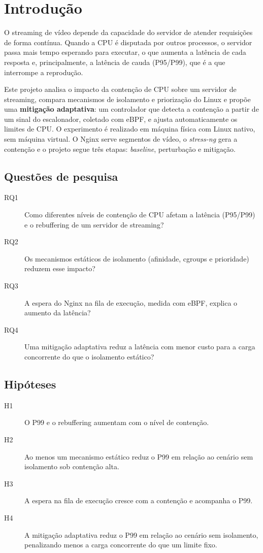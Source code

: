 \documentclass[12pt,a4paper]{article}
\begin{document}
\newpage
\tableofcontents
\newpage

\section{Introdução}

O streaming de vídeo depende da capacidade do servidor de atender requisições de forma contínua. Quando
a CPU é disputada por outros processos, o servidor passa mais tempo esperando para executar, o que
aumenta a latência de cada resposta e, principalmente, a latência de cauda (P95/P99), que é a que
interrompe a reprodução.

Este projeto analisa o impacto da contenção de CPU sobre um servidor de streaming, compara mecanismos de
isolamento e priorização do Linux e propõe uma \textbf{mitigação adaptativa}: um controlador que detecta a
contenção a partir de um sinal do escalonador, coletado com eBPF, e ajusta automaticamente os limites de CPU.
O experimento é realizado em máquina física com Linux nativo, sem máquina virtual. O Nginx serve segmentos de
vídeo, o \textit{stress-ng} gera a contenção e o projeto segue três etapas: \textit{baseline}, perturbação e
mitigação.

\subsection{Questões de pesquisa}
\begin{description}
    \item[RQ1] Como diferentes níveis de contenção de CPU afetam a latência (P95/P99) e o rebuffering de um
    servidor de streaming?
    \item[RQ2] Os mecanismos estáticos de isolamento (afinidade, cgroups e prioridade) reduzem esse impacto?
    \item[RQ3] A espera do Nginx na fila de execução, medida com eBPF, explica o aumento da latência?
    \item[RQ4] Uma mitigação adaptativa reduz a latência com menor custo para a carga concorrente do que o
    isolamento estático?
\end{description}

\subsection{Hipóteses}
\begin{description}
    \item[H1] O P99 e o rebuffering aumentam com o nível de contenção.
    \item[H2] Ao menos um mecanismo estático reduz o P99 em relação ao cenário sem isolamento sob contenção alta.
    \item[H3] A espera na fila de execução cresce com a contenção e acompanha o P99.
    \item[H4] A mitigação adaptativa reduz o P99 em relação ao cenário sem isolamento, penalizando menos a
    carga concorrente do que um limite fixo.
\end{description}
\end{document}
